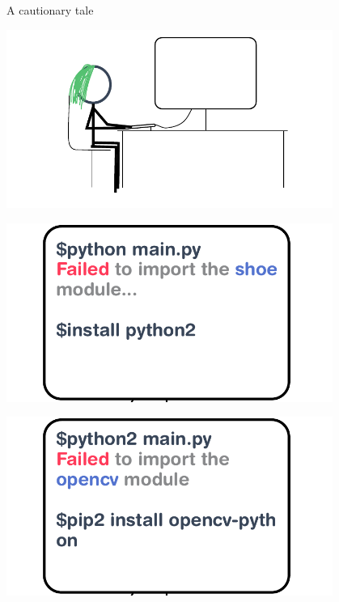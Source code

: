 \documentclass[aspectratio=169]{beamer}
\begin{document}
\begin{frame}{A cautionary tale}
{\begin{center}
        \end{center}
    }
     {
        \huge {}
        \begin{center}
        \includegraphics[width=0.8\textwidth]{img/princess-comics-computer.pdf}
        \end{center}
    }
     {
        \huge {}
        \begin{center}
        \includegraphics[width=0.8\textwidth]{img/princess-comics-try-1.pdf}
        \end{center}
    }
     {
        \huge {}
        \begin{center}
        \includegraphics[width=0.8\textwidth]{img/princess-comics-try-2.pdf}

\end{center}}
\end{frame}
\end{document}
